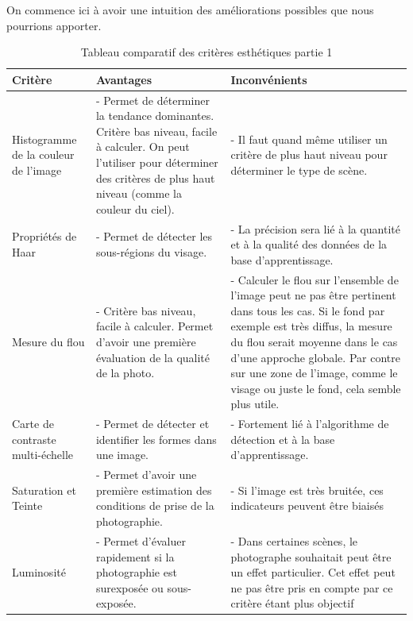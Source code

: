 \documentclass[11pt, french,screen]{report-rd-info}
\begin{document}
On commence ici à avoir une intuition des améliorations possibles que nous pourrions apporter.
\begin{table}
\begin{center}
\begin{tabular}{|p{3cm}|p{6cm}|p{7cm}|}
\hline
\textbf{Critère} & \textbf{Avantages} & \textbf{Inconvénients} \\ \hline
Histogramme de la couleur de l'image & - Permet de déterminer la tendance dominantes. Critère bas niveau, facile à calculer. On peut l'utiliser pour déterminer des critères de plus haut niveau (comme la couleur du ciel). & - Il faut quand même utiliser un critère de plus haut niveau pour déterminer le type de scène. \\ \hline
Propriétés de Haar & - Permet de détecter les sous-régions du visage. & - La précision sera lié à la quantité et à la qualité des données de la base d'apprentissage. \\ \hline
Mesure du flou & - Critère bas niveau, facile à calculer. Permet d'avoir une première évaluation de la qualité de la photo. & - Calculer le flou sur l'ensemble de l'image peut ne pas être pertinent dans tous les cas. Si le fond par exemple est très diffus, la mesure du flou serait moyenne dans le cas d'une approche globale. Par contre sur une zone de l'image, comme le visage ou juste le fond, cela semble plus utile. \\ \hline
Carte de contraste multi-échelle & - Permet de détecter et identifier les formes dans une image. & - Fortement lié à l’algorithme de détection et à la base d'apprentissage. \\ \hline
Saturation et Teinte & - Permet d'avoir une première estimation des conditions de prise de la photographie. & - Si l'image est très bruitée, ces indicateurs peuvent être biaisés \\ \hline
Luminosité & - Permet d'évaluer rapidement si la photographie est surexposée ou sous-exposée. & - Dans certaines scènes, le photographe souhaitait peut être un effet particulier. Cet effet peut ne pas être pris en compte par ce critère étant plus objectif\\ \hline
\end{tabular}
\end{center}
\caption{Tableau comparatif des critères esthétiques partie 1}
\label{tab:ComparaisonCriteres1}
\end{table}
\end{document}
